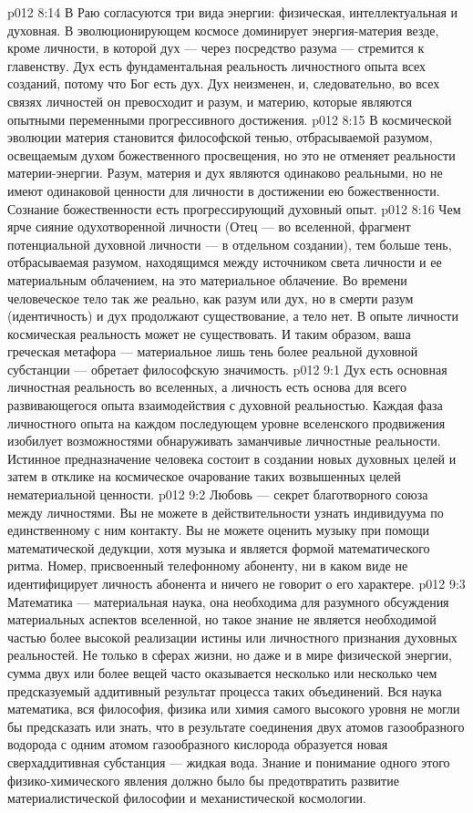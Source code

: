 \vs p012 8:14 \pc В Раю согласуются три вида энергии: физическая, интеллектуальная и духовная. В эволюционирующем космосе доминирует энергия\hyp{}материя везде, кроме личности, в которой дух --- через посредство разума --- стремится к главенству. Дух есть фундаментальная реальность личностного опыта всех созданий, потому что Бог есть дух. Дух неизменен, и, следовательно, во всех связях личностей он превосходит и разум, и материю, которые являются опытными переменными прогрессивного достижения.
\vs p012 8:15 В космической эволюции материя становится философской тенью, отбрасываемой разумом, освещаемым духом божественного просвещения, но это не отменяет реальности материи\hyp{}энергии. Разум, материя и дух являются одинаково реальными, но не имеют одинаковой ценности для личности в достижении ею божественности. Сознание божественности есть прогрессирующий духовный опыт.
\vs p012 8:16 Чем ярче сияние одухотворенной личности (Отец --- во вселенной, фрагмент потенциальной духовной личности --- в отдельном создании), тем больше тень, отбрасываемая разумом, находящимся между источником света личности и ее материальным облачением, на это материальное облачение. Во времени человеческое тело так же реально, как разум или дух, но в смерти разум (идентичность) и дух продолжают существование, а тело нет. В опыте личности космическая реальность может не существовать. И таким образом, ваша греческая метафора --- материальное лишь тень более реальной духовной субстанции --- обретает философскую значимость.
\vs p012 9:1 Дух есть основная личностная реальность во вселенных, а личность есть основа для всего развивающегося опыта взаимодействия с духовной реальностью. Каждая фаза личностного опыта на каждом последующем уровне вселенского продвижения изобилует возможностями обнаруживать заманчивые личностные реальности. Истинное предназначение человека состоит в создании новых духовных целей и затем в отклике на космическое очарование таких возвышенных целей нематериальной ценности.
\vs p012 9:2 \pc Любовь --- секрет благотворного союза между личностями. Вы не можете в действительности узнать индивидуума по единственному с ним контакту. Вы не можете оценить музыку при помощи математической дедукции, хотя музыка и является формой математического ритма. Номер, присвоенный телефонному абоненту, ни в каком виде не идентифицирует личность абонента и ничего не говорит о его характере.
\vs p012 9:3 Математика --- материальная наука, она необходима для разумного обсуждения материальных аспектов вселенной, но такое знание не является необходимой частью более высокой реализации истины или личностного признания духовных реальностей. Не только в сферах жизни, но даже и в мире физической энергии, сумма двух или более вещей часто оказывается несколько  или несколько  чем предсказуемый аддитивный результат процесса таких объединений. Вся наука математика, вся философия, физика или химия самого высокого уровня не могли бы предсказать или знать, что в результате соединения двух атомов газообразного водорода с одним атомом газообразного кислорода образуется новая сверхаддитивная субстанция --- жидкая вода. Знание и понимание одного этого физико\hyp{}химического явления должно было бы предотвратить развитие материалистической философии и механистической космологии.
